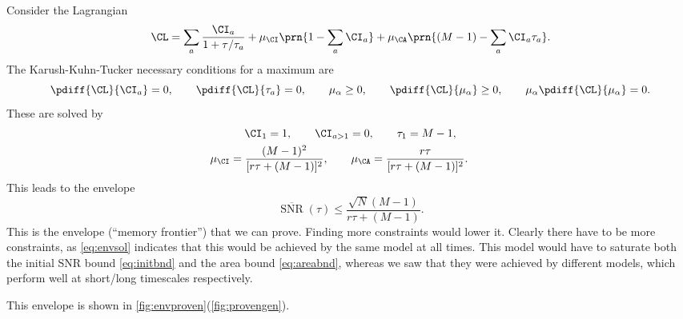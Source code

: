 \documentclass[12pt]{article}
\newcommand{\kktm}{\mu}
\DeclareMathOperator{\snr}{SNR}
\newcommand{\snrb}{\overline{\snr}}
\begin{document}
Consider the Lagrangian
%
\begin{equation}\label{eq:envlagrangian}
  \CL = \sum_a \frac{\CI_a}{1+\tau/\tau_a} + \kktm_\CI \prn{1 - \sum_a \CI_a} + \kktm_\CA \prn{(M-1) - \sum_a \CI_a \tau_a}.
\end{equation}
%
The Karush-Kuhn-Tucker necessary conditions for a maximum are
%
\begin{equation}\label{eq:envKTcond}
  \pdiff{\CL}{\CI_a} = 0, \qquad
  \pdiff{\CL}{\tau_a} = 0, \qquad
  \kktm_\alpha \geq 0, \qquad
  \pdiff{\CL}{\kktm_\alpha} \geq 0, \qquad
  \kktm_\alpha\pdiff{\CL}{\kktm_\alpha} = 0.
\end{equation}
%
These are solved by
%
\begin{equation}\label{eq:envsol}
\begin{gathered}
  \CI_1 = 1, \qquad
  \CI_{a>1} = 0, \qquad
  \tau_1 = M-1, \\
  \kktm_\CI = \frac{(M-1)^2}{[r\tau + (M-1)]^2}, \qquad
  \kktm_\CA = \frac{r\tau}{[r\tau+(M-1)]^2}. \qquad
\end{gathered}
\end{equation}
%
This leads to the envelope
%
\begin{equation}\label{eq:env}
  \snrb(\tau) \leq \frac{\sqrt{N}(M-1)}{r\tau + (M-1)}.
\end{equation}
%
This is the envelope (``memory frontier'') that we can prove.
Finding more constraints would lower it.
Clearly there have to be more constraints, as \eqref{eq:envsol} indicates that this would be achieved by the same model at all times.
This model would have to saturate both the initial SNR bound \eqref{eq:initbnd} and the area bound \eqref{eq:areabnd}, whereas we saw that they were achieved by different models, which perform well at short/long timescales respectively.

This envelope is shown in \cref{fig:envproven}(\ref{fig:provengen}).
\end{document}
